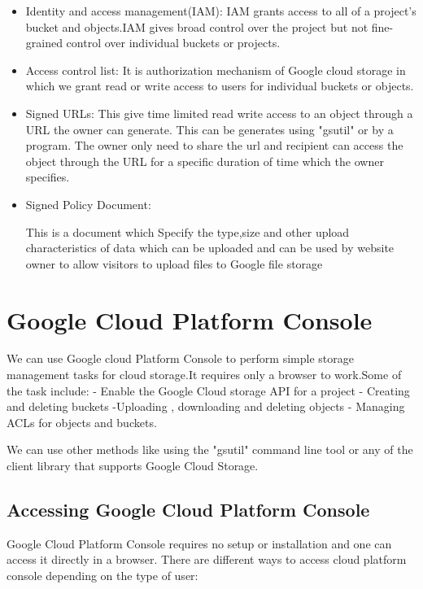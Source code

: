 \documentclass[9pt,twocolumn,twoside]{styles/osajnl}
\begin{document}
\begin{itemize}


\item Identity and access management(IAM):
IAM grants access to all of a project's bucket and objects.IAM gives broad control over the project but not fine-grained control over individual buckets or projects.

\item Access control list:
 It is authorization mechanism of Google cloud storage in which we grant read or write access to users for individual buckets or objects.


\item Signed URLs: 
This give time limited read write access to an object through a URL the owner can generate. This can be generates using "gsutil" or by a program. The owner only need to share the url and recipient can access the object through the URL for a specific duration of time which the owner specifies.


\item Signed Policy Document:

This is a document which Specify the type,size and other upload characteristics of data which can be uploaded and can be used by website owner to allow visitors to upload files to Google file storage

\end{itemize}

\section{Google Cloud Platform Console }
We can use Google cloud Platform Console to perform simple storage management tasks for cloud storage.It requires only a browser to work.Some of the task include:
- Enable the Google Cloud storage API for a project
- Creating and deleting buckets 
-Uploading , downloading and deleting objects
- Managing ACLs for objects and buckets.


We can use other methods like using the "gsutil" command line tool or any of the client library that supports Google Cloud Storage.

\subsection{Accessing Google Cloud Platform Console}

Google Cloud Platform Console requires no setup or installation and one can access it directly in a browser. There are different ways to access cloud platform console depending on the type of user:
\end{document}
